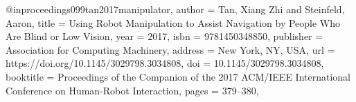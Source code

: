 @inproceedings{099tan2017manipulator,
author = {Tan, Xiang Zhi and Steinfeld, Aaron},
title = {Using Robot Manipulation to Assist Navigation by People Who Are Blind or Low Vision},
year = {2017},
isbn = {9781450348850},
publisher = {Association for Computing Machinery},
address = {New York, NY, USA},
url = {https://doi.org/10.1145/3029798.3034808},
doi = {10.1145/3029798.3034808},
booktitle = {Proceedings of the Companion of the 2017 ACM/IEEE International Conference on Human-Robot Interaction},
pages = {379–380},
}
